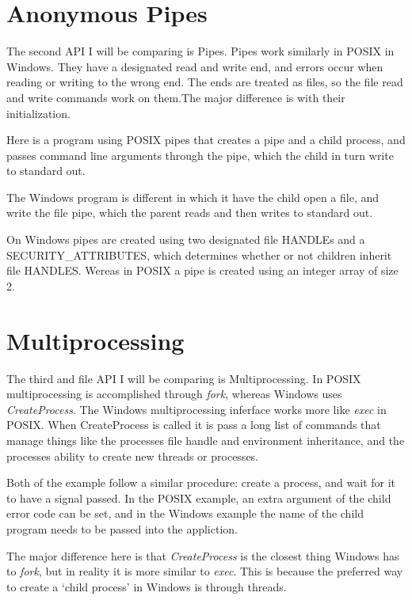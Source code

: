 \documentclass[letterpaper,10pt]{article}
\begin{document}
\section{Anonymous Pipes}

The second API I will be comparing is Pipes. Pipes work similarly in
POSIX in Windows. They have a designated read and write end, and errors
occur when reading or writing to the wrong end. The ends are treated as
files, so the file read and write commands work on them.The major
difference is with their initialization.

Here is a program using POSIX pipes that creates a pipe and a child
process, and passes command line arguments through the pipe, which the
child in turn write to standard out.

The Windows program is different in which it have the child open a
file, and write the file pipe, which the parent reads and then writes to
standard out.




On Windows pipes are created using two designated file HANDLEs and a
SECURITY_ATTRIBUTES, which determines whether or not children inherit
file HANDLES. Wereas in POSIX a pipe is created using an integer array
of size 2.

\section{Multiprocessing}

The third and file API I will be comparing is Multiprocessing. In POSIX
multiprocessing is accomplished through \emph{fork}, whereas Windows
uses \emph{CreateProcess}. The Windows multiprocessing inferface works
more like \emph{exec} in POSIX. When CreateProcess is called it
is pass a long list of commands that manage things like the processes
file handle and environment inheritance, and the processes ability to
create new threads or processes.

Both of the example follow a similar procedure: create a process, and
wait for it to have a signal passed. In the POSIX example, an extra
argument of the child error code can be set, and in the Windows example
the name of the child program needs to be passed into the appliction.




The major difference here is that \emph{CreateProcess} is the closest
thing Windows has to \emph{fork}, but in reality it is more similar to
\emph{exec}. This is because the preferred way to create a `child
process' in Windows is through threads.
\end{document}
